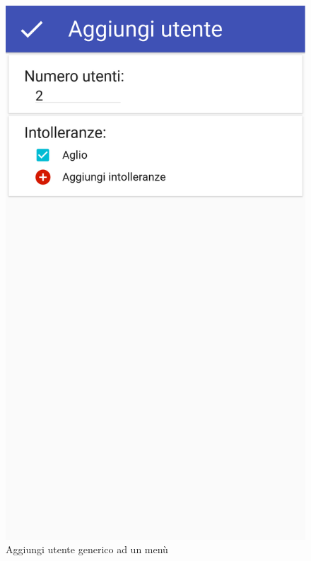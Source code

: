 \begin{figure}[H]
\begin{minipage}{.49\textwidth}
		\includegraphics[width=\textwidth]{img/wireframe/aggiungi_utente_generico_ok.png}
		\caption{Aggiungi utente generico ad un menù}
		\label{fig:aggiungi_utente_generico}
	\end{minipage}
\end{figure}	
